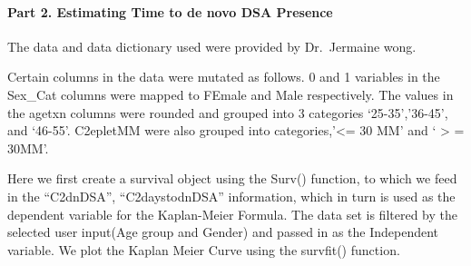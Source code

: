 \documentclass[a4paper,9pt,twocolumn,twoside,]{pinp}
\begin{document}
\begin{Shaded}
\begin{Highlighting}[]
\StringTok{ }\NormalTok{(}\NormalTok{), }
    \NormalTok{(}\OperatorTok{+}\StringTok{ }
\StringTok{    }\NormalTok{(} \NormalTok{, }
         \NormalTok{, }
         \NormalTok{, }
         \NormalTok{) }\OperatorTok{+}\StringTok{ }
\StringTok{    }\NormalTok{(} \NormalTok{(} \NormalTok{, }
         \NormalTok{)) }\OperatorTok{+}\StringTok{ }
\StringTok{    }\NormalTok{(} \NormalTok{, }
         \NormalTok{) }\OperatorTok{+}\StringTok{ }
\StringTok{    }\NormalTok{()}
\end{Highlighting}
\end{Shaded}

\hypertarget{part-2.-estimating-time-to-de-novo-dsa-presence}{%
\paragraph{Part 2. Estimating Time to de novo DSA
Presence}\label{part-2.-estimating-time-to-de-novo-dsa-presence}}

The data and data dictionary used were provided by Dr.~Jermaine wong.

Certain columns in the data were mutated as follows. 0 and 1 variables
in the Sex\_Cat columns were mapped to FEmale and Male respectively. The
values in the agetxn columns were rounded and grouped into 3 categories
`25-35','36-45', and `46-55'. C2epletMM were also grouped into
categories,'\textless{}= 30 MM' and ` \textgreater{} = 30MM'.

Here we first create a survival object using the Surv() function, to
which we feed in the ``C2dnDSA'', ``C2daystodnDSA'' information, which
in turn is used as the dependent variable for the Kaplan-Meier Formula.
The data set is filtered by the selected user input(Age group and
Gender) and passed in as the Independent variable. We plot the Kaplan
Meier Curve using the survfit() function.
\end{document}

